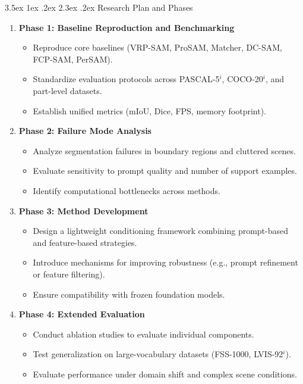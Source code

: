 \documentclass[journal,12pt,onecolumn,draftclsnofoot]{IEEEtran}
\makeatletter
\renewcommand{\section}{\@startsection{section}{1}{\z@}%
    {3.5ex \@plus 1ex \@minus .2ex}%
    {2.3ex \@plus.2ex}%
    {\normalfont\Large\bfseries}}
\makeatother
\begin{document}
\section{Research Plan and Phases}
\begin{enumerate}
    \item \textbf{Phase 1: Baseline Reproduction and Benchmarking}
    \begin{itemize}
        \item Reproduce core baselines (VRP-SAM, ProSAM, Matcher, DC-SAM, FCP-SAM, PerSAM).
        \item Standardize evaluation protocols across PASCAL-5$^i$, COCO-20$^i$, and part-level datasets.
        \item Establish unified metrics (mIoU, Dice, FPS, memory footprint).
    \end{itemize}
    
    \item \textbf{Phase 2: Failure Mode Analysis}
    \begin{itemize}
        \item Analyze segmentation failures in boundary regions and cluttered scenes.
        \item Evaluate sensitivity to prompt quality and number of support examples.
        \item Identify computational bottlenecks across methods.
    \end{itemize}
    
    \item \textbf{Phase 3: Method Development}
    \begin{itemize}
        \item Design a lightweight conditioning framework combining prompt-based and feature-based strategies.
        \item Introduce mechanisms for improving robustness (e.g., prompt refinement or feature filtering).
        \item Ensure compatibility with frozen foundation models.
    \end{itemize}
    
    \item \textbf{Phase 4: Extended Evaluation}
    \begin{itemize}
        \item Conduct ablation studies to evaluate individual components.
        \item Test generalization on large-vocabulary datasets (FSS-1000, LVIS-92$^i$).
        \item Evaluate performance under domain shift and complex scene conditions.
    \end{itemize}
    

\end{enumerate}
\end{document}
